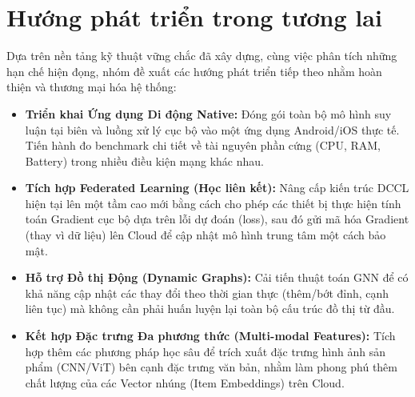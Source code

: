 \section{Hướng phát triển trong tương lai}

Dựa trên nền tảng kỹ thuật vững chắc đã xây dựng, cùng việc phân tích những hạn chế hiện đọng, nhóm đề xuất các hướng phát triển tiếp theo nhằm hoàn thiện và thương mại hóa hệ thống:

\begin{itemize}
    \item \textbf{Triển khai Ứng dụng Di động Native:} Đóng gói toàn bộ mô hình suy luận tại biên và luồng xử lý cục bộ vào một ứng dụng Android/iOS thực tế. Tiến hành đo benchmark chi tiết về tài nguyên phần cứng (CPU, RAM, Battery) trong nhiều điều kiện mạng khác nhau.
    
    \item \textbf{Tích hợp Federated Learning (Học liên kết):} Nâng cấp kiến trúc DCCL hiện tại lên một tầm cao mới bằng cách cho phép các thiết bị thực hiện tính toán Gradient cục bộ dựa trên lỗi dự đoán (loss), sau đó gửi mã hóa Gradient (thay vì dữ liệu) lên Cloud để cập nhật mô hình trung tâm một cách bảo mật.
    
    \item \textbf{Hỗ trợ Đồ thị Động (Dynamic Graphs):} Cải tiến thuật toán GNN để có khả năng cập nhật các thay đổi theo thời gian thực (thêm/bớt đỉnh, cạnh liên tục) mà không cần phải huấn luyện lại toàn bộ cấu trúc đồ thị từ đầu.
    
    \item \textbf{Kết hợp Đặc trưng Đa phương thức (Multi-modal Features):} Tích hợp thêm các phương pháp học sâu để trích xuất đặc trưng hình ảnh sản phẩm (CNN/ViT) bên cạnh đặc trưng văn bản, nhằm làm phong phú thêm chất lượng của các Vector nhúng (Item Embeddings) trên Cloud.
\end{itemize}
